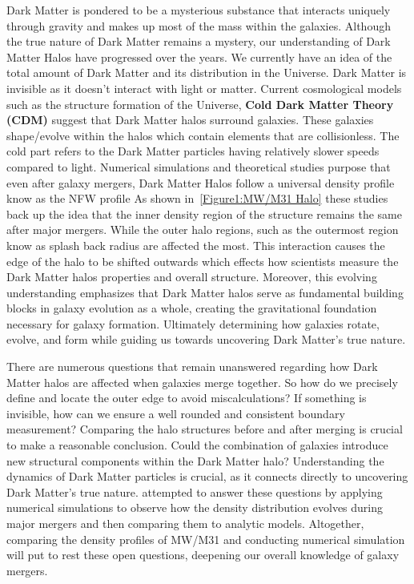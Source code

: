 \documentclass[fleqn,usenatbib]{mnras}
\begin{document}
Dark Matter is pondered to be a mysterious substance that interacts uniquely through gravity and makes up most of the mass within the galaxies. Although the true nature of Dark Matter remains a mystery, our understanding of Dark Matter Halos have progressed over the years. We currently have an idea of the total amount of Dark Matter and its distribution in the Universe. Dark Matter is invisible as it doesn't interact with light or matter. Current cosmological models such as the structure formation of the Universe, \textbf{Cold Dark Matter Theory (CDM)} suggest that Dark Matter halos surround galaxies. These galaxies shape/evolve within the halos which contain elements that are collisionless. The cold part refers to the Dark Matter particles having relatively slower speeds compared to light. Numerical simulations and theoretical studies purpose that even after galaxy mergers, Dark Matter Halos follow a universal density profile know as the NFW profile \citep{2019MNRAS.487..993D} As shown in~\ref{Figure1:MW/M31 Halo} these studies back up the idea that the inner density region of the structure remains the same after major mergers. While the outer halo regions, such as the outermost region know as splash back radius are affected the most. This interaction causes the edge of the halo to be shifted outwards which effects how scientists measure the Dark Matter halos properties and overall structure. Moreover, this evolving understanding emphasizes that Dark Matter halos serve as fundamental building blocks in galaxy evolution as a whole, creating the gravitational foundation necessary for galaxy formation. Ultimately determining how galaxies rotate, evolve, and form while guiding us towards uncovering Dark Matter's true nature.

There are numerous questions that remain unanswered regarding how Dark Matter halos are affected when galaxies merge together. So how do we precisely define and locate the outer edge to avoid miscalculations? If something is invisible, how can we ensure a  well rounded and consistent boundary measurement? Comparing the halo structures before and after merging is crucial to make a reasonable conclusion. Could the combination of galaxies introduce new structural components within the Dark Matter halo? Understanding the dynamics of Dark Matter particles is crucial, as it connects directly to uncovering Dark Matter's true nature. \cite{2019MNRAS.487..993D} attempted to answer these questions by applying numerical simulations to observe how the density distribution evolves during major mergers and then comparing them to analytic models. Altogether, comparing the density profiles of MW/M31 and conducting numerical simulation will put to rest these open questions, deepening our overall knowledge of galaxy mergers.
\end{document}
